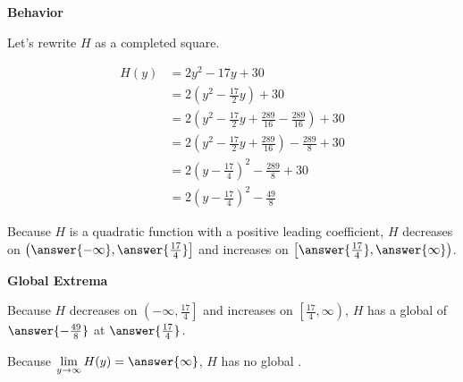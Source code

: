 \documentclass{ximera}
\begin{document}
\begin{exercise}
\begin{question}
\end{question}




\begin{question}  \textbf{\textcolor{blue!55!black}{Behavior}}

Let's rewrite $H$ as a completed square.


\begin{align*}
H(y) & = 2y^2 - 17y + 30 \\
& = 2 \left( y^2 - \frac{17}{2} y \right) + 30  \\
& = 2 \left( y^2 - \frac{17}{2} y + \frac{289}{16} - \frac{289}{16} \right) + 30 \\
& = 2 \left( y^2 - \frac{17}{2} y + \frac{289}{16}  \right) - \frac{289}{8} + 30 \\
& = 2 \left( y - \frac{17}{4}  \right)^2 - \frac{289}{8} + 30 \\
& = 2 \left( y - \frac{17}{4}  \right)^2 - \frac{49}{8}
\end{align*}








Because $H$ is a quadratic function with a positive leading coefficient, $H$ decreases on $\left( \answer{-\infty}, \answer{\frac{17}{4}} \right]$ and increases on $\left[ \answer{\frac{17}{4}}, \answer{\infty} \right)$. 

\end{question}









\begin{question}  \textbf{\textcolor{blue!55!black}{Global Extrema}}

Because $H$ decreases on $\left( -\infty, \frac{17}{4} \right]$ and increases on $\left[ \frac{17}{4}, \infty \right)$, $H$ has a global   of $\answer{-\frac{49}{8}}$ at $\answer{\frac{17}{4}}$.



Because $\lim\limits_{y \to \infty} H(y) = \answer{\infty}$, $H$ has no global .

\end{question}













\end{exercise}
\end{document}
